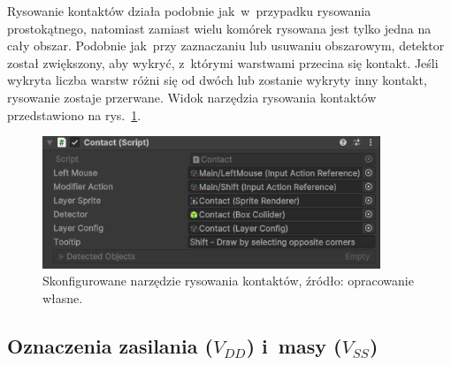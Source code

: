 Rysowanie kontaktów działa podobnie jak~w~przypadku rysowania prostokątnego,
natomiast zamiast wielu komórek rysowana jest tylko jedna na cały obszar.
Podobnie jak~przy zaznaczaniu lub usuwaniu obszarowym,
detektor został zwiększony, aby wykryć,
z~którymi warstwami przecina się kontakt.
Jeśli wykryta liczba warstw różni się od dwóch lub zostanie wykryty inny kontakt,
rysowanie zostaje przerwane.
Widok narzędzia rysowania kontaktów przedstawiono na rys.~\ref{fig:contact}.

\begin{figure}[h!]
    \centering
    \includegraphics[width=0.9\textwidth]{chapters/chapter4/rys/tools/contact}
    \caption[Skonfigurowane narzędzie rysowania kontaktów.]
        {Skonfigurowane narzędzie rysowania kontaktów, źródło: opracowanie własne.}
    \label{fig:contact}
\end{figure}

\subsection{Oznaczenia zasilania ($V_{DD}$) i~masy ($V_{SS}$)}
\label{subsec:oznaczenia_zasilania}

